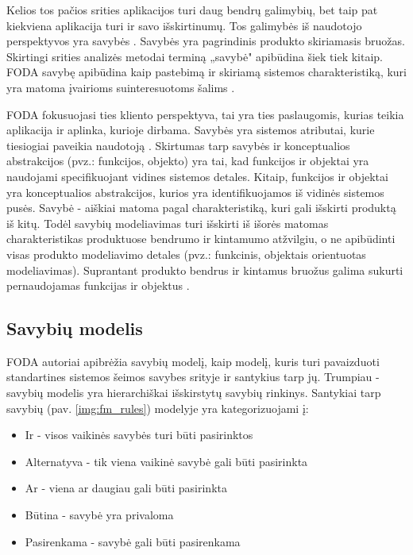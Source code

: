 \documentclass{VUMIFPSkursinis}
\begin{document}
Kelios tos pačios srities aplikacijos turi daug bendrų galimybių, bet taip pat kiekviena aplikacija turi ir savo išskirtinumų. Tos galimybės iš naudotojo perspektyvos yra savybės \cite{Kang1990}. Savybės yra pagrindinis produkto skiriamasis bruožas. Skirtingi srities analizės metodai terminą „savybė" apibūdina šiek tiek kitaip. FODA \cite{Kang1990} savybę apibūdina kaip pastebimą ir skiriamą sistemos charakteristiką, kuri yra matoma įvairioms suinteresuotoms šalims \cite{Lee2015}.

FODA fokusuojasi ties kliento perspektyva, tai yra ties paslaugomis, kurias teikia aplikacija ir aplinka, kurioje dirbama. Savybės yra sistemos atributai, kurie tiesiogiai paveikia naudotoją \cite{Kang1990}. Skirtumas tarp savybės ir konceptualios abstrakcijos (pvz.: funkcijos, objekto) yra tai, kad funkcijos ir objektai yra naudojami specifikuojant vidines sistemos detales. Kitaip, funkcijos ir objektai yra konceptualios abstrakcijos, kurios yra identifikuojamos iš vidinės sistemos pusės. Savybė - aiškiai matoma  pagal charakteristiką, kuri gali išskirti produktą iš kitų. Todėl savybių modeliavimas turi išskirti iš išorės matomas charakteristikas produktuose bendrumo ir kintamumo atžvilgiu, o ne apibūdinti visas produkto modeliavimo detales (pvz.: funkcinis, objektais orientuotas modeliavimas). Suprantant produkto bendrus ir kintamus bruožus galima sukurti pernaudojamas funkcijas ir objektus \cite{Lee2015}.

\subsection{Savybių modelis}

FODA \cite{Kang1990} autoriai apibrėžia savybių modelį, kaip modelį, kuris turi pavaizduoti standartines sistemos šeimos savybes srityje ir santykius tarp jų. Trumpiau - savybių modelis yra hierarchiškai išskirstytų savybių rinkinys. Santykiai tarp savybių (pav. \ref{img:fm_rules}) modelyje yra kategorizuojami į:
\begin{itemize}
\item Ir - visos vaikinės savybės turi būti pasirinktos
\item Alternatyva - tik viena vaikinė savybė gali būti pasirinkta 
\item Ar - viena ar daugiau gali būti pasirinkta
\item Būtina - savybė yra privaloma
\item Pasirenkama - savybė gali būti pasirenkama
\end{itemize}
\end{document}
